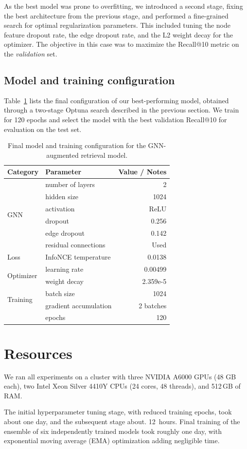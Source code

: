 As the best model was prone to overfitting, we introduced a second stage, fixing the best architecture from the previous stage, and performed a fine-grained search for optimal regularization parameters. This included tuning the node feature dropout rate, the edge dropout rate, and the L2 weight decay for the optimizer. The objective in this case was to maximize the Recall@10 metric on the \emph{validation} set.

\subsection{Model and training configuration}
Table~\ref{tab:gnn_config} lists the final configuration of our best-performing model, obtained through a two-stage Optuna search described in the previous section. We train for 120 epochs and select the model with the best validation Recall@10 for evaluation on the test set.

\begin{table}[h!]
\centering
\small
\caption{Final model and training configuration for the GNN-augmented retrieval model.}
\begin{tabular}{llr}
\toprule
\textbf{Category} & \textbf{Parameter} & \textbf{Value / Notes} \\
\midrule
\multirow{6}{*}{GNN} 
 & number of layers & 2 \\
 & hidden size & 1024 \\
 & activation & ReLU \\
 & dropout & 0.256 \\
 & edge dropout & 0.142 \\
 & residual connections & Used \\
\midrule
Loss & InfoNCE temperature & 0.0138 \\
\midrule
\multirow{2}{*}{Optimizer} 
 & learning rate & 0.00499 \\
 & weight decay & 2.359e-5 \\
\midrule
\multirow{2}{*}{Training} 
 & batch size & 1024 \\
 & gradient accumulation & 2 batches \\
 & epochs & 120 \\
\bottomrule
\end{tabular}
\label{tab:gnn_config}
\end{table}


\section{Resources}

We ran all experiments on a cluster with three NVIDIA A6000 GPUs (48 GB each), two Intel Xeon Silver 4410Y CPUs (24 cores, 48 threads), and 512\,GB of RAM.

The initial hyperparameter tuning stage, with reduced training epochs, took about one day, and the subsequent stage about. 12~hours. Final training of the ensemble of six independently trained models took roughly one day, with exponential moving average (EMA) optimization adding negligible time.
